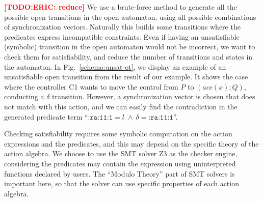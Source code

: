 \documentclass{lncs/llncs}
\newcommand{\TODO}[1]{\textcolor{red}{\textbf{[TODO:#1]}}}
\newcommand{\OTvar}{\texttt}
\newcommand{\OTland}{\;\land\ }
\begin{document}
\TODO{ERIC: reduce}
We use a brute-force method to generate all the possible open
transitions in the open automaton, using all possible combinations of
synchronization vectors. Naturally this builds some transitions where
the predicates express incompatible constraints. Even if having an
unsatisfiable (symbolic) transition in the open automaton would not be incorrect,
we want to check them for satisfiability, and reduce the number of
transitions and states in the automaton.
In Fig.~\ref{schema:unsat-ot}, we display an example of an
unsatisfiable open transition 
from the result of our example. It shows the case where
the controller C1 wants to move the control from $P$ to $(acc(x);Q)$,
conducting a $\delta$ transition. However, a synchronization
vector is chosen that does not match with this action, and we can
easily find the contradiction in the 
generated predicate term ``$\OTvar{:ra:11:1}=l \!\OTland\! \delta=\OTvar{:ra:11:1}$''. 

Checking satisfiability requires some symbolic computation
on the action expressions and the predicates, and this 
may depend on the specific theory of the action algebra. 
We choose to use the SMT solver Z3 as the checker engine, considering
the predicates may contain the expression 
using uninterpreted functions declared by users.
The ``Modulo Theory'' part of SMT solvers is important here, so that
the solver can use specific properties of each action algebra.
\end{document}
